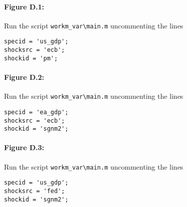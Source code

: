 \documentclass[12pt]{article}
\begin{document}
\paragraph{Figure D.1:}
Run the script
\verb|workm_var\main.m| uncommenting the lines
\begin{verbatim}
specid = 'us_gdp';
shocksrc = 'ecb';
shockid = 'pm';
\end{verbatim}


\paragraph{Figure D.2:}
Run the script
\verb|workm_var\main.m| uncommenting the lines
\begin{verbatim}
specid = 'ea_gdp';
shocksrc = 'ecb';
shockid = 'sgnm2';
\end{verbatim}

\paragraph{Figure D.3:}
Run the script
\verb|workm_var\main.m| uncommenting the lines
\begin{verbatim}
specid = 'us_gdp';
shocksrc = 'fed';
shockid = 'sgnm2';
\end{verbatim}



%
%
\end{document}
